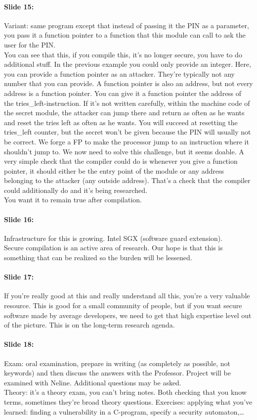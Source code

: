 \documentclass[10pt,a4paper]{report}
\begin{document}
\paragraph{Slide 15:} Variant: same program except that instead of passing it the PIN as a parameter, you pass it a function pointer to a function that this module can call to ask the user for the PIN.\\ 
You can see that this, if you compile this, it's no longer secure, you have to do additional stuff. In the previous example you could only provide an integer. Here, you can provide a function pointer as an attacker. They're typically not any number that you can provide. A function pointer is also an address, but not every address is a function pointer. You can give it a function pointer the address of the tries\_left-instruction. If it's not written carefully, within the machine code of the secret module, the attacker can jump there and return as often as he wants and reset the tries left as often as he wants. You will succeed at resetting the tries\_left counter, but the secret won't be given because the PIN will usually not be correct. We forge a FP to make the processor jump to an instruction where it shouldn't jump to. We now need to solve this challenge, but it seems doable. A very simple check that the compiler could do is whenever you give a function pointer, it should either be the entry point of the module or any address belonging to the attacker (any outside address). That's a check that the compiler could additionally do and it's being researched.\\
You want it to remain true after compilation. 

\paragraph{Slide 16:} Infrastructure for this is growing. Intel SGX (software guard extension). \\
Secure compilation is an active area of research. Our hope is that this is something that can be realized so the burden will be lessened.
 
\paragraph{Slide 17:} If you're really good at this and really understand all this, you're a very valuable resource. This is good for a small community of people, but if you want secure software made by average developers, we need to get that high expertise level out of the picture. This is on the long-term research agenda. 

\paragraph{Slide 18:} Exam:  oral examination, prepare in writing (as completely as possible, not keywords) and then discuss the answers with the Professor. Project will be examined with Neline. Additional questions may be asked.\\
Theory: it's a theory exam, you can't bring notes. Both checking that you know terms, sometimes they're broad theory questions. Exercises: applying what you've learned: finding a vulnerability in a C-program, specify a security automaton,\ldots
\end{document}
